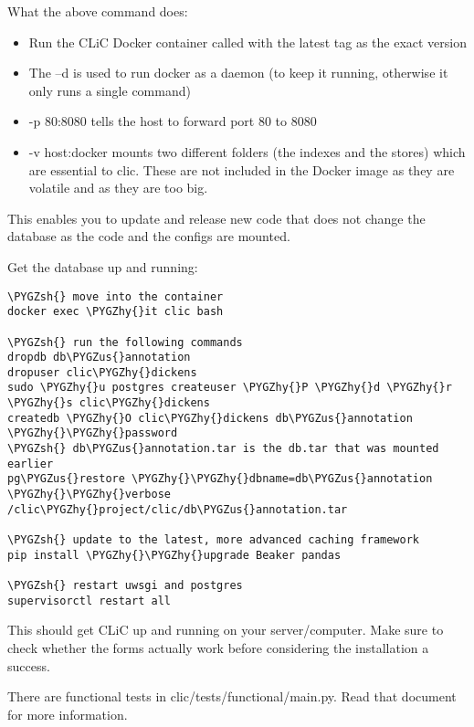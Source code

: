 \documentclass[letterpaper,10pt,english]{sphinxmanual}
\def\PYGZus{\char`\_}
\def\PYGZsh{\char`\#}
\def\PYGZhy{\char`\-}
\begin{document}
What the above command does:
\begin{itemize}
\item {} 
Run the CLiC Docker container called with the latest tag
as the exact version

\item {} 
The –d is used to run docker as a daemon (to keep it running,
otherwise it only runs a single command)

\item {} 
-p 80:8080 tells the host to forward port 80 to 8080

\item {} 
-v host:docker mounts two different folders (the indexes and the stores)
which are essential to clic. These are not included in the Docker image as
they are volatile and as they are too big.

\end{itemize}

This enables you to update and release new code that does not change the database
as the code and the configs are mounted.

Get the database up and running:

\begin{Verbatim}[commandchars=\\\{\}]
\PYGZsh{} move into the container
docker exec \PYGZhy{}it clic bash

\PYGZsh{} run the following commands
dropdb db\PYGZus{}annotation
dropuser clic\PYGZhy{}dickens
sudo \PYGZhy{}u postgres createuser \PYGZhy{}P \PYGZhy{}d \PYGZhy{}r \PYGZhy{}s clic\PYGZhy{}dickens
createdb \PYGZhy{}O clic\PYGZhy{}dickens db\PYGZus{}annotation \PYGZhy{}\PYGZhy{}password
\PYGZsh{} db\PYGZus{}annotation.tar is the db.tar that was mounted earlier
pg\PYGZus{}restore \PYGZhy{}\PYGZhy{}dbname=db\PYGZus{}annotation \PYGZhy{}\PYGZhy{}verbose /clic\PYGZhy{}project/clic/db\PYGZus{}annotation.tar

\PYGZsh{} update to the latest, more advanced caching framework
pip install \PYGZhy{}\PYGZhy{}upgrade Beaker pandas

\PYGZsh{} restart uwsgi and postgres
supervisorctl restart all
\end{Verbatim}

This should get CLiC up and running on your server/computer. Make sure to check
whether the forms actually work before considering the installation a success.

There are functional tests in clic/tests/functional/main.py. Read that document
for more information.
\end{document}
